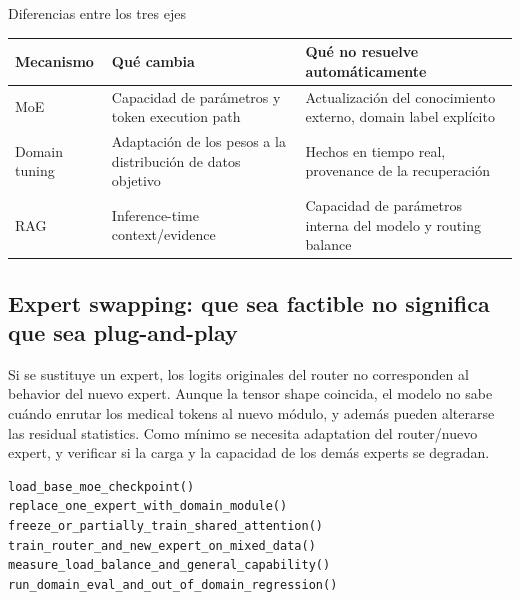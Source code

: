 \documentclass[a4paper]{article}
\begin{document}
\begin{knowledgebox}{Diferencias entre los tres ejes}
\begin{tabularx}{\textwidth}{L{0.18\textwidth} L{0.27\textwidth} X}
\toprule
Mecanismo & Qué cambia & Qué no resuelve automáticamente \\
\midrule
MoE & Capacidad de parámetros y token execution path & Actualización del conocimiento externo, domain label explícito \\
Domain tuning & Adaptación de los pesos a la distribución de datos objetivo & Hechos en tiempo real, provenance de la recuperación \\
RAG & Inference-time context/evidence & Capacidad de parámetros interna del modelo y routing balance \\
\bottomrule
\end{tabularx}
\end{knowledgebox}


\subsection{Expert swapping: que sea factible no significa que sea plug-and-play}

Si se sustituye un expert, los logits originales del router no corresponden al behavior del nuevo expert. Aunque la tensor shape coincida, el modelo no sabe cuándo enrutar los medical tokens al nuevo módulo, y además pueden alterarse las residual statistics. Como mínimo se necesita adaptation del router/nuevo expert, y verificar si la carga y la capacidad de los demás experts se degradan.

\begin{lstlisting}[caption={Flujo mínimo de validación tras sustituir un expert}]
load_base_moe_checkpoint()
replace_one_expert_with_domain_module()
freeze_or_partially_train_shared_attention()
train_router_and_new_expert_on_mixed_data()
measure_load_balance_and_general_capability()
run_domain_eval_and_out_of_domain_regression()
\end{lstlisting}

\end{document}
